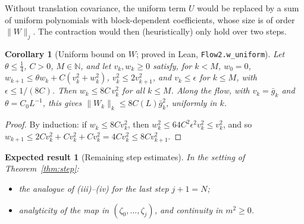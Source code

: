 \documentclass[11pt]{amsart}
\newtheorem{corollary}[theorem]{Corollary}
\newtheorem{conjecture}[theorem]{Expected result}
\theoremstyle{definition}
\theoremstyle{remark}
\numberwithin{equation}{section}
\begin{document}
Without translation covariance, the uniform term $U$ would be replaced by a sum of uniform
polynomials with block-dependent coefficients, whose size is of order $\|W\|_j$. The
contraction would then (heuristically) only hold over two steps.

\begin{corollary}[Uniform bound on $W$; proved in Lean, \texttt{Flow2.w\_uniform}]\label{cor:W-uniform}
Let $\theta\le\frac14$, $C>0$, $M\in\mathbb N$, and let $v_k,w_k\ge0$ satisfy, for $k<M$, $w_0=0$,
$w_{k+1}\le\theta w_k+C(v_k^2+w_k^2)$, $v_k^2\le2v_{k+1}^2$, and $v_k\le\epsilon$ for $k\le M$, with
$\epsilon\le1/(8C)$. Then $w_k\le8C\,v_k^2$ for all $k\le M$. Along the flow, with $v_k=\bar g_k$
and $\theta=C_0L^{-1}$, this gives $\|W_k\|_k\le8C(L)\bar g_k^2$, uniformly in $k$.
\end{corollary}

\begin{proof}
By induction: if $w_k\le8Cv_k^2$, then $w_k^2\le64C^2\epsilon^2v_k^2\le v_k^2$, and so
$w_{k+1}\le2Cv_k^2+Cv_k^2+Cv_k^2=4Cv_k^2\le8Cv_{k+1}^2$.
\end{proof}

\begin{conjecture}[Remaining step estimates]\label{thm:step-rest}
In the setting of Theorem~\ref{thm:step}:
\begin{itemize}
\item the analogue of (iii)--(iv) for the last step $j+1=N$;
\item analyticity of the map in $(\zeta_0,\dots,\zeta_j)$, and continuity in $m^2\ge0$.
\end{itemize}
\end{conjecture}
\end{document}

